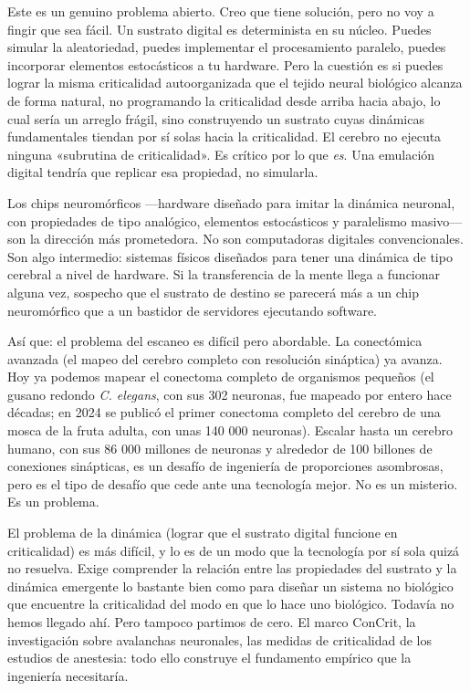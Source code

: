 \documentclass[11pt, twoside, openright]{book}
\begin{document}
Este es un genuino problema abierto. Creo que tiene solución, pero no voy a fingir que sea fácil. Un sustrato digital es determinista en su núcleo. Puedes simular la aleatoriedad, puedes implementar el procesamiento paralelo, puedes incorporar elementos estocásticos a tu hardware. Pero la cuestión es si puedes lograr la misma criticalidad autoorganizada que el tejido neural biológico alcanza de forma natural, no programando la criticalidad desde arriba hacia abajo, lo cual sería un arreglo frágil, sino construyendo un sustrato cuyas dinámicas fundamentales tiendan por sí solas hacia la criticalidad. El cerebro no ejecuta ninguna «subrutina de criticalidad». Es crítico por lo que \textit{es}. Una emulación digital tendría que replicar esa propiedad, no simularla.

Los chips neuromórficos ---hardware diseñado para imitar la dinámica neuronal, con propiedades de tipo analógico, elementos estocásticos y paralelismo masivo--- son la dirección más prometedora. No son computadoras digitales convencionales. Son algo intermedio: sistemas físicos diseñados para tener una dinámica de tipo cerebral a nivel de hardware. Si la transferencia de la mente llega a funcionar alguna vez, sospecho que el sustrato de destino se parecerá más a un chip neuromórfico que a un bastidor de servidores ejecutando software.

Así que: el problema del escaneo es difícil pero abordable. La conectómica avanzada (el mapeo del cerebro completo con resolución sináptica) ya avanza. Hoy ya podemos mapear el conectoma completo de organismos pequeños (el gusano redondo \textit{C. elegans}, con sus 302 neuronas, fue mapeado por entero hace décadas; en 2024 se publicó el primer conectoma completo del cerebro de una mosca de la fruta adulta, con unas 140 000 neuronas). Escalar hasta un cerebro humano, con sus 86 000 millones de neuronas y alrededor de 100 billones de conexiones sinápticas, es un desafío de ingeniería de proporciones asombrosas, pero es el tipo de desafío que cede ante una tecnología mejor. No es un misterio. Es un problema.

El problema de la dinámica (lograr que el sustrato digital funcione en criticalidad) es más difícil, y lo es de un modo que la tecnología por sí sola quizá no resuelva. Exige comprender la relación entre las propiedades del sustrato y la dinámica emergente lo bastante bien como para diseñar un sistema no biológico que encuentre la criticalidad del modo en que lo hace uno biológico. Todavía no hemos llegado ahí. Pero tampoco partimos de cero. El marco ConCrit, la investigación sobre avalanchas neuronales, las medidas de criticalidad de los estudios de anestesia: todo ello construye el fundamento empírico que la ingeniería necesitaría.
\end{document}
